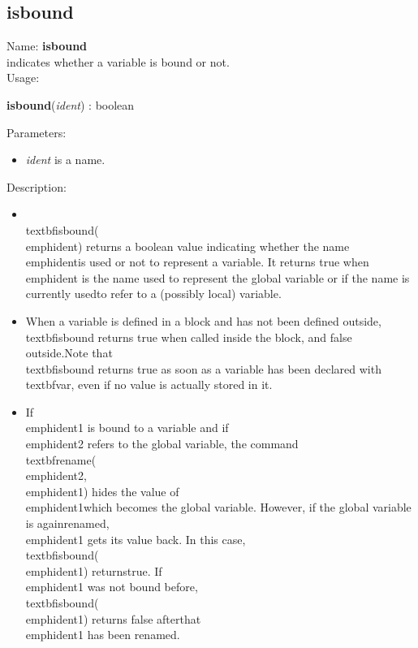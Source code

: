 \subsection{isbound}
\label{labisbound}
\noindent Name: \textbf{isbound}\\
indicates whether a variable is bound or not.\\
\noindent Usage: 
\begin{center}
\textbf{isbound}(\emph{ident}) : \textsf{boolean}\\
\end{center}
Parameters: 
\begin{itemize}
\item \emph{ident} is a name.
\end{itemize}
\noindent Description: \begin{itemize}

\item \\textbf{isbound}(\\emph{ident}) returns a boolean value indicating whether the name \\emph{ident}\n   is used or not to represent a variable. It returns true when \\emph{ident} is the \n   name used to represent the global variable or if the name is currently used\n   to refer to a (possibly local) variable.\n
\item When a variable is defined in a block and has not been defined outside, \n   \\textbf{isbound} returns true when called inside the block, and false outside.\n   Note that \\textbf{isbound} returns true as soon as a variable has been declared with \n   \\textbf{var}, even if no value is actually stored in it.\n
\item If \\emph{ident1} is bound to a variable and if \\emph{ident2} refers to the global \n   variable, the command \\textbf{rename}(\\emph{ident2}, \\emph{ident1}) hides the value of \\emph{ident1}\n   which becomes the global variable. However, if the global variable is again\n   renamed, \\emph{ident1} gets its value back. In this case, \\textbf{isbound}(\\emph{ident1}) returns\n   true. If \\emph{ident1} was not bound before, \\textbf{isbound}(\\emph{ident1}) returns false after\n   that \\emph{ident1} has been renamed.\n\end{itemize}
